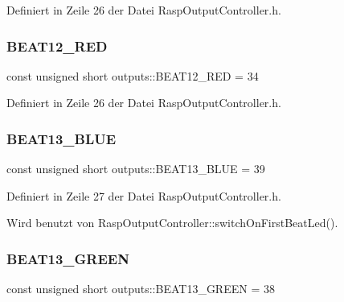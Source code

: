 Definiert in Zeile 26 der Datei Rasp\+Output\+Controller.\+h.

\mbox{\label{namespaceoutputs_a3138968cd14e309f1e88228bd1259f3f}} 
\subsubsection{\texorpdfstring{B\+E\+A\+T12\+\_\+\+R\+ED}{BEAT12\_RED}}
{\footnotesize\ttfamily const unsigned short outputs\+::\+B\+E\+A\+T12\+\_\+\+R\+ED = 34}



Definiert in Zeile 26 der Datei Rasp\+Output\+Controller.\+h.

\mbox{\label{namespaceoutputs_a38a0eba17cc5ed8eed42c37dca1feb3f}} 
\subsubsection{\texorpdfstring{B\+E\+A\+T13\+\_\+\+B\+L\+UE}{BEAT13\_BLUE}}
{\footnotesize\ttfamily const unsigned short outputs\+::\+B\+E\+A\+T13\+\_\+\+B\+L\+UE = 39}



Definiert in Zeile 27 der Datei Rasp\+Output\+Controller.\+h.



Wird benutzt von Rasp\+Output\+Controller\+::switch\+On\+First\+Beat\+Led().

\mbox{\label{namespaceoutputs_a3410f51b9ac465ad73e71e8bd54b3ab4}} 
\subsubsection{\texorpdfstring{B\+E\+A\+T13\+\_\+\+G\+R\+E\+EN}{BEAT13\_GREEN}}
{\footnotesize\ttfamily const unsigned short outputs\+::\+B\+E\+A\+T13\+\_\+\+G\+R\+E\+EN = 38}



